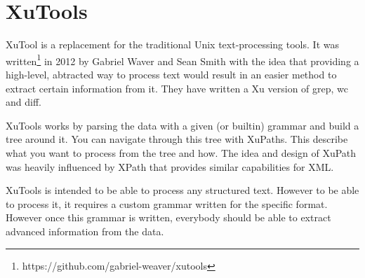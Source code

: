 \chapter{XuTools}

XuTool\cite{xutools} is a replacement for the traditional Unix text-processing tools. It was written\footnote{https://github.com/gabriel-weaver/xutools} in 2012 by Gabriel Waver and Sean Smith with the idea that providing a high-level, abtracted way to process text would result in an easier method to extract certain information from it. They have written a Xu version of grep, wc and diff.


XuTools works by parsing the data with a given (or builtin) grammar and build a tree around it. You can navigate through this tree with XuPaths. This describe what you want to process from the tree and how. The idea and design of XuPath was heavily influenced by XPath that provides similar capabilities for XML.

XuTools is intended to be able to process any structured text. However to be able to process it, it requires a custom grammar written for the specific format. However once this grammar is written, everybody should be able to extract advanced information from the data.

